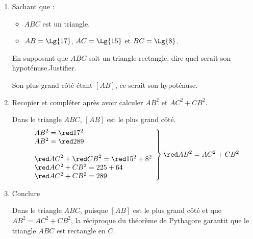\begin{corrige}
    \begin{enumerate}
        \item Sachant que :
        \begin{itemize}
            \item $ABC$ est un triangle.
            \item $AB=\Lg{17}$, $AC=\Lg{15}$ et $BC=\Lg{8}$.
        \end{itemize}
        En supposant que $ABC$ soit un triangle rectangle, dire quel serait son hypoténuse.Justifier.

        {\red Son plus grand côté étant $[AB]$, ce serait son hypoténuse.}
        \item Recopier et compléter après avoir calculer $AB^2$ et $AC^2+CB^2$.
        
            Dans le triangle $ABC$, $[AB]$ est le plus {\red grand côté.}
            $$\left.\begin{array}{l}
            AB^2={\red 17^2}\\
            AB^2={\red 289}\\
            \\
            {\red AC}^2+{\red CB}^2={\red 15^2+8^2}\\
            {\red AC^2+ CB^2=225+64}\\
            {\red AC^2+ CB^2= 289}\\
            \end{array}
            \right\rbrace {\red AB^2=AC^2+CB^2}$$
        \item Conclure
        
        {\red Dans le triangle $ABC$, puisque $[AB]$ est le plus grand côté et que $AB^2=AC^2+CB^2$, la réciproque du théorème de Pythagore garantit que 
        le triangle $ABC$ est rectangle en $C$.}
    \end{enumerate}
\end{corrige}

